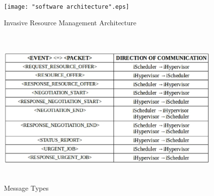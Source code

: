 \documentclass[a4paper, 12pt]{article}
\begin{document}
\begin{figure}[!htbp]
\centering
\texttt{[image: "software architecture".eps]}
\caption{Invasive Resource Management Architecture}
\label{fig:7}
\end{figure}
\begin{figure}[h]
\centering
\includegraphics[width=1.0\textwidth, height=80mm]{table.eps}
\caption{Message Types}
\label{fig:8}
\end{figure}
\end{document}
